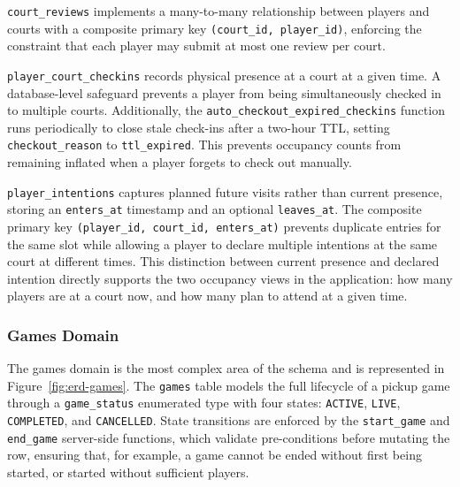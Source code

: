 \texttt{court\_reviews} implements a many-to-many relationship between players and courts with a composite primary key \texttt{(court\_id, player\_id)}, enforcing the constraint that each player may submit at most one review per court. 

\texttt{player\_court\_checkins} records physical presence at a court at a given time. 
A database-level safeguard prevents a player from being simultaneously checked in to multiple courts. 
Additionally, the \texttt{auto\_checkout\_expired\_checkins} function runs periodically to close stale check-ins after a two-hour TTL, setting \texttt{checkout\_reason} to \texttt{ttl\_expired}. 
This prevents occupancy counts from remaining inflated when a player forgets to check out manually.

\texttt{player\_intentions} captures planned future visits rather than current presence, storing an \texttt{enters\_at} timestamp and an optional \texttt{leaves\_at}. 
The composite primary key \texttt{(player\_id, court\_id, enters\_at)} prevents duplicate entries for the same slot while allowing a player to declare multiple intentions at the same court at different times. 
This distinction between current presence and declared intention directly supports the two occupancy views in the application: how many players are at a court now, and how many plan to attend at a given time. 

\subsubsection{Games Domain}

The games domain is the most complex area of the schema and is represented in Figure~\ref{fig:erd-games}.
The \texttt{games} table models the full lifecycle of a pickup game through a \texttt{game\_status} enumerated type with four states: \texttt{ACTIVE}, \texttt{LIVE}, \texttt{COMPLETED}, and \texttt{CANCELLED}. 
State transitions are enforced by the \texttt{start\_game} and \texttt{end\_game} server-side functions, which validate pre-conditions before mutating the row, ensuring that, for example, a game cannot be ended without first being started, or started without sufficient players.

